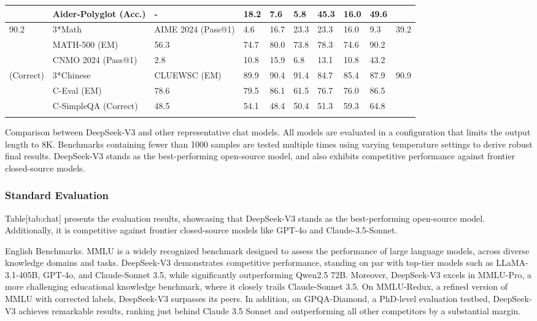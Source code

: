 \documentclass[11pt,a4paper]{article}
\begin{document}
\begin{table}[h]
\begin{tabular}{|l|l|l|l|l|l|l|l|l|l|}
 & Aider-Polyglot (Acc.) & - & 18.2 & 7.6 & 5.8 & 45.3 & 16.0 & 49.6 &  \\ \hline
90.2 & 3*Math & AIME 2024 (Pass@1) & 4.6 & 16.7 & 23.3 & 23.3 & 16.0 & 9.3 & 39.2 \\ \hline
 & MATH-500 (EM) & 56.3 & 74.7 & 80.0 & 73.8 & 78.3 & 74.6 & 90.2 &  \\ \hline
 & CNMO 2024 (Pass@1) & 2.8 & 10.8 & 15.9 & 6.8 & 13.1 & 10.8 & 43.2 &  \\ \hline
(Correct) & 3*Chinese & CLUEWSC (EM) & 89.9 & 90.4 & 91.4 & 84.7 & 85.4 & 87.9 & 90.9 \\ \hline
 & C-Eval (EM) & 78.6 & 79.5 & 86.1 & 61.5 & 76.7 & 76.0 & 86.5 &  \\ \hline
 & C-SimpleQA (Correct) & 48.5 & 54.1 & 48.4 & 50.4 & 51.3 & 59.3 & 64.8 &  \\ \hline
 &  &  &  &  &  &  &  &  &  \\ \hline
\end{tabular}
\end{table}

Comparison between DeepSeek-V3 and other representative chat models. 
 All models are evaluated in a configuration that limits the output length to 8K.
 Benchmarks containing fewer than 1000 samples are tested multiple times using varying temperature settings to derive robust final results.
 DeepSeek-V3 stands as the best-performing open-source model, and also exhibits competitive performance against frontier closed-source models.

\subsubsection{Standard Evaluation}

Table[tab:chat] presents the evaluation results, showcasing that DeepSeek-V3 stands as the best-performing open-source model. 
Additionally, it is competitive against frontier closed-source models like GPT-4o and Claude-3.5-Sonnet.

English Benchmarks.
MMLU is a widely recognized benchmark designed to assess the performance of large language models, across diverse knowledge domains and tasks. 
DeepSeek-V3 demonstrates competitive performance, standing on par with top-tier models such as LLaMA-3.1-405B, GPT-4o, and Claude-Sonnet 3.5, while significantly outperforming Qwen2.5 72B. 
Moreover, DeepSeek-V3 excels in MMLU-Pro, a more challenging educational knowledge benchmark, where it closely trails Claude-Sonnet 3.5. 
On MMLU-Redux, a refined version of MMLU with corrected labels, DeepSeek-V3 surpasses its peers. 
In addition, on GPQA-Diamond, a PhD-level evaluation testbed, DeepSeek-V3 achieves remarkable results, ranking just behind Claude 3.5 Sonnet and outperforming all other competitors by a substantial margin.
\end{document}
